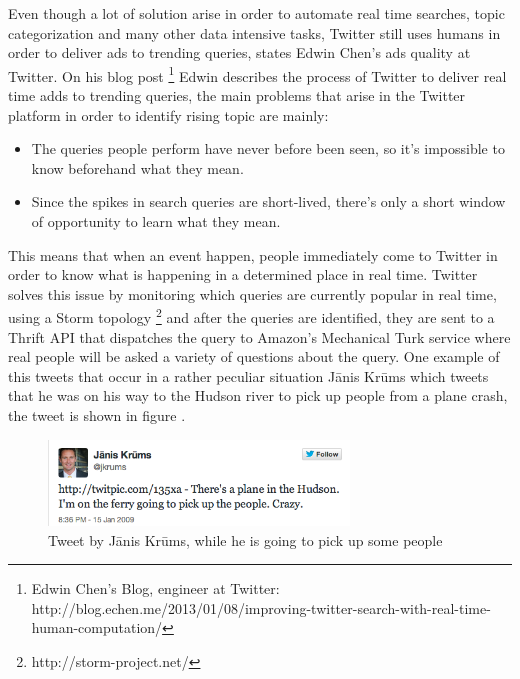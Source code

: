 Even though a lot of solution arise in order to automate real time searches, topic categorization and many other data intensive tasks, Twitter still uses humans in order to deliver ads to trending queries, states Edwin Chen's ads quality at Twitter. On his blog post \footnote{Edwin Chen's Blog, engineer at Twitter: http://blog.echen.me/2013/01/08/improving-twitter-search-with-real-time-human-computation/} Edwin describes the process of Twitter to deliver real time adds to trending queries, the main problems that arise in the Twitter platform in order to identify rising topic are mainly:
\begin{itemize}
  \item The queries people perform have never before been seen, so it's impossible to know beforehand what they mean.
  \item Since the spikes in search queries are short-lived, there's only a short window of opportunity to learn what they mean.
\end{itemize}
This means that when an event happen, people immediately come to Twitter in order to know what is happening in a determined place in real time. Twitter solves this issue by monitoring which queries are currently popular in real time, using a Storm topology \footnote{http://storm-project.net/} and after the queries are identified, they are sent to a Thrift API that dispatches the query to Amazon's Mechanical Turk service where real people will be asked a variety of questions about the query. One example of this tweets that occur in a rather peculiar situation Jānis Krūms which tweets that he was on his way to the Hudson river to pick up people from a plane crash, the tweet is shown in figure .

\begin{figure}[tb]
  \begin{center}
    \includegraphics[width=8cm]{images/8_hudson.png}
  \end{center}
  \caption{Tweet by Jānis Krūms, while he is going to pick up some people}
  \label{fig:hudson}
\end{figure}

